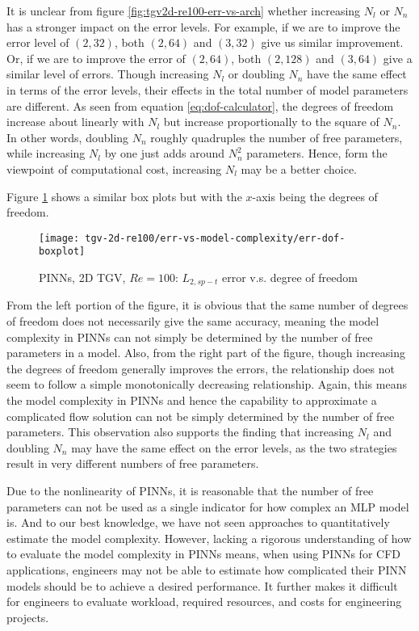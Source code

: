 It is unclear from figure \ref{fig:tgv2d-re100-err-vs-arch} whether increasing $N_l$ or $N_n$ has a stronger impact on the error levels.
For example, if we are to improve the error level of $(2, 32)$, both $(2, 64)$ and $(3, 32)$ give us similar improvement.
Or, if we are to improve the error of $(2, 64)$, both $(2, 128)$ and $(3, 64)$ give a similar level of errors.
Though increasing $N_l$ or doubling $N_n$ have the same effect in terms of the error levels, their effects in the total number of model parameters are different. 
As seen from equation \eqref{eq:dof-calculator}, the degrees of freedom increase about linearly with $N_l$ but increase proportionally to the square of $N_n$.
In other words, doubling $N_n$ roughly quadruples the number of free parameters, while increasing $N_l$ by one just adds around $N_n^2$ parameters.
Hence, form the viewpoint of computational cost, increasing $N_l$ may be a better choice.

Figure \ref{fig:tgv2d-re100-err-vs-dof} shows a similar box plots but with the $x$-axis being the degrees of freedom.
\begin{figure}[hbt!]
    \centering%
    \texttt{[image: tgv-2d-re100/err-vs-model-complexity/err-dof-boxplot]}
    \caption[%
        PINNs, 2D TGV, $Re=100$: $L_{2,sp-t}$ error v.s. degree of freedom%
    ]{%
        PINNs, 2D TGV, $Re=100$: $L_{2,sp-t}$ error v.s. degree of freedom%
    }
    \label{fig:tgv2d-re100-err-vs-dof}
\end{figure}
From the left portion of the figure, it is obvious that the same number of degrees of freedom does not necessarily give the same accuracy, meaning the model complexity in PINNs can not simply be determined by the number of free parameters in a model.
Also, from the right part of the figure, though increasing the degrees of freedom generally improves the errors, the relationship does not seem to follow a simple monotonically decreasing relationship.
Again, this means the model complexity in PINNs and hence the capability to approximate a complicated flow solution can not be simply determined by the number of free parameters.
This observation also supports the finding that increasing $N_l$ and doubling $N_n$ may have the same effect on the error levels, as the two strategies result in very different numbers of free parameters.

Due to the nonlinearity of PINNs, it is reasonable that the number of free parameters can not be used as a single indicator for how complex an MLP model is.
And to our best knowledge, we have not seen approaches to quantitatively estimate the model complexity.
However, lacking a rigorous understanding of how to evaluate the model complexity in PINNs means, when using PINNs for CFD applications, engineers may not be able to estimate how complicated their PINN models should be to achieve a desired performance.
It further makes it difficult for engineers to evaluate workload, required resources, and costs for engineering projects.


